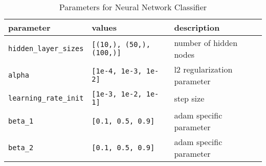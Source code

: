 \begin{table}[H]
	\caption{Parameters for Neural Network Classifier}
	\label{NNParams}
	\begin{tabularx}{\textwidth}{ l l X }
		parameter & values & description \\
		\hline		
		\texttt{hidden\_layer\_sizes} & \texttt{[(10,), (50,), (100,)]} & number of hidden nodes \\
		\texttt{alpha} & \texttt{[1e-4, 1e-3, 1e-2]} & l2 regularization parameter \\
		\texttt{learning\_rate\_init} & \texttt{[1e-3, 1e-2, 1e-1]} & step size \\
		\texttt{beta\_1} & \texttt{[0.1, 0.5, 0.9]} & adam specific parameter \\ 
		\texttt{beta\_2} & \texttt{[0.1, 0.5, 0.9]} & adam specific parameter
	\end{tabularx}
\end{table}

